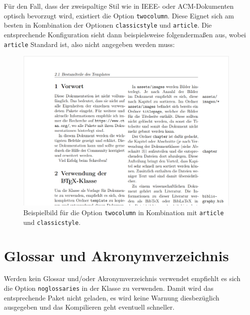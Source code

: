 
Für den Fall, dass der zweispaltige Stil wie in IEEE- oder ACM-Dokumenten optisch bevorzugt wird, existiert die Option \texttt{twocolumn}. Diese Eignet sich am besten in Kombination der Optionen \texttt{classicstyle} und \texttt{article}. Die entsprechende Konfiguration sieht dann beispielsweise folgendermaßen aus, wobei \texttt{article} Standard ist, also nicht angegeben werden muss:


\begin{showcase}
    \tcblower
    \begin{figure}[H]
        \centering
        \includegraphics[width=0.8\columnwidth]{assets/images/klassenoptionen/twocolumn_classicstyle_article.png}
        \caption{Beispielbild für die Option \texttt{twocolumn} in Kombination mit \texttt{article} und \texttt{classicstyle}.}
    \end{figure}
\end{showcase}

\section{Glossar und Akronymverzeichnis}
Werden kein Glossar und/oder Akronymverzeichnis verwendet empfiehlt es sich die Option \texttt{noglossaries} in der Klasse zu verwenden. Damit wird das entsprechende Paket nicht geladen, es wird keine Warnung diesbezüglich ausgegeben und das Kompilieren geht eventuell schneller.

